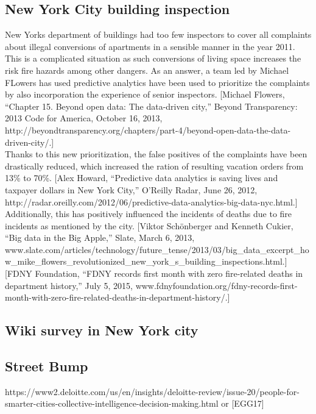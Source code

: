 \documentclass[a4paper,12pt]{report}
\begin{document}
	\subsection{New York City building inspection}
	New Yorks department of buildings had too few inspectors to cover all complaints about illegal conversions of apartments in a sensible manner in the year 2011. This is a complicated situation as such conversions of living space increases the risk fire hazards among other dangers. As an answer, a team led by Michael FLowers has used predictive analytics have been used to prioritize the complaints by also incorporation the experience of senior inspectors. [Michael Flowers, “Chapter 15. Beyond open data: The data-driven city,” Beyond Transparency: 2013 Code for America, October 16, 2013, http://beyondtransparency.org/chapters/part-4/beyond-open-data-the-data-driven-city/.]\\
	Thanks to this new prioritization, the false positives of the complaints have been drastically reduced, which increased the ration of resulting vacation orders from 13\% to 70\%. [Alex Howard, “Predictive data analytics is saving lives and taxpayer dollars in New York City,” O’Reilly Radar, June 26, 2012, http://radar.oreilly.com/2012/06/predictive-data-analytics-big-data-nyc.html.]\\
	Additionally, this has positively influenced the incidents of deaths due to fire incidents as mentioned by the city. [Viktor Schönberger and Kenneth Cukier, “Big data in the Big Apple,” Slate, March 6, 2013, www.slate.com/articles/technology/future_tense/2013/03/big_data_excerpt_how_mike_flowers_revolutionized_new_york_s_building_inspections.html.]
[FDNY Foundation, “FDNY records first month with zero fire-related deaths in department history,” July 5, 2015, www.fdnyfoundation.org/fdny-records-first-month-with-zero-fire-related-deaths-in-department-history/.]

	
	
	
	

	\subsection{Wiki survey in New York city}

	\subsection{Street Bump}
	https://www2.deloitte.com/us/en/insights/deloitte-review/issue-20/people-for-smarter-cities-collective-intelligence-decision-making.html or [EGG17]\\	
	
\end{document}
